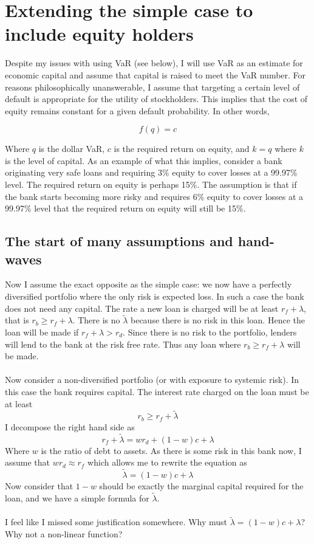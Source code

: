 \documentclass{article}
\begin{document}
\section{Extending the simple case to include equity holders}
Despite my issues with using VaR (see below), I will use VaR as an estimate for economic capital and assume that capital is raised to meet the VaR number.  For reasons philosophically unanswerable, I assume that targeting a certain level of default is appropriate for the utility of stockholders.  This implies that the cost of equity remains constant for a given default probability.  In other words, 

\[f(q)=c\]

Where \(q\) is the dollar VaR, \(c\) is the required return on equity, and \(k=q\) where \(k\) is the level of capital.  As an example of what this implies, consider a bank originating very safe loans and requiring 3\% equity to cover losses at a 99.97\% level.  The required return on equity is perhaps 15\%.  The assumption is that if the bank starts becoming more risky and requires 6\% equity to cover losses at a 99.97\% level that the required return on equity will still be 15\%.  

\subsection{The start of many assumptions and hand-waves}

Now I assume the exact opposite as the simple case: we now have a perfectly diversified portfolio where the only risk is expected loss.  In such a case the bank does not need any capital.  The rate a new loan is charged will be at least \(r_f+\lambda\), that is \(r_b \geq r_f+\lambda\).  There is no \(\tilde{\lambda}\) because there is no risk in this loan.  Hence the loan will be made if \(r_f+\lambda>r_d\).  Since there is no risk to the portfolio, lenders will lend to the bank at the risk free rate.  Thus any loan where \(r_b\geq r_f+\lambda\) will be made.  
\\
\\
Now consider a non-diversified portfolio (or with exposure to systemic risk). In this case the bank requires capital. The interest rate charged on the loan must be at least
\[r_b\geq r_f+\tilde{\lambda}\]
I decompose the right hand side as 
\[r_f+\tilde{\lambda}=w r_d +(1-w) c+\lambda\]
Where \(w\) is the ratio of debt to assets.  As there is some risk in this bank now, I assume that \(w r_d \approx r_f\) which allows me to rewrite the equation as 
\[\tilde{\lambda}=(1-w)c+\lambda\]
Now consider that \(1-w\) should be exactly the marginal capital required for the loan, and we have a simple formula for \(\tilde{\lambda}\).  
\\
\\
I feel like I missed some justification somewhere.  Why must \(\tilde{\lambda}=(1-w)c+\lambda\)?  Why not a non-linear function?
\end{document}

